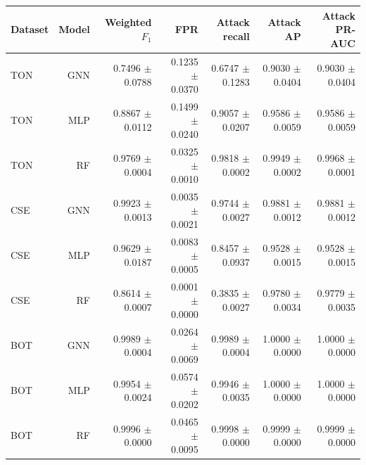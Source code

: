 \begin{tabular}{lrrrrrr}
\toprule
Dataset & Model & Weighted $F_1$ & FPR & Attack recall & Attack AP & Attack PR-AUC \\
\midrule
TON & GNN & 0.7496 $\pm$ 0.0788 & 0.1235 $\pm$ 0.0370 & 0.6747 $\pm$ 0.1283 & 0.9030 $\pm$ 0.0404 & 0.9030 $\pm$ 0.0404 \\
TON & MLP & 0.8867 $\pm$ 0.0112 & 0.1499 $\pm$ 0.0240 & 0.9057 $\pm$ 0.0207 & 0.9586 $\pm$ 0.0059 & 0.9586 $\pm$ 0.0059 \\
TON & RF & 0.9769 $\pm$ 0.0004 & 0.0325 $\pm$ 0.0010 & 0.9818 $\pm$ 0.0002 & 0.9949 $\pm$ 0.0002 & 0.9968 $\pm$ 0.0001 \\
CSE & GNN & 0.9923 $\pm$ 0.0013 & 0.0035 $\pm$ 0.0021 & 0.9744 $\pm$ 0.0027 & 0.9881 $\pm$ 0.0012 & 0.9881 $\pm$ 0.0012 \\
CSE & MLP & 0.9629 $\pm$ 0.0187 & 0.0083 $\pm$ 0.0005 & 0.8457 $\pm$ 0.0937 & 0.9528 $\pm$ 0.0015 & 0.9528 $\pm$ 0.0015 \\
CSE & RF & 0.8614 $\pm$ 0.0007 & 0.0001 $\pm$ 0.0000 & 0.3835 $\pm$ 0.0027 & 0.9780 $\pm$ 0.0034 & 0.9779 $\pm$ 0.0035 \\
BOT & GNN & 0.9989 $\pm$ 0.0004 & 0.0264 $\pm$ 0.0069 & 0.9989 $\pm$ 0.0004 & 1.0000 $\pm$ 0.0000 & 1.0000 $\pm$ 0.0000 \\
BOT & MLP & 0.9954 $\pm$ 0.0024 & 0.0574 $\pm$ 0.0202 & 0.9946 $\pm$ 0.0035 & 1.0000 $\pm$ 0.0000 & 1.0000 $\pm$ 0.0000 \\
BOT & RF & 0.9996 $\pm$ 0.0000 & 0.0465 $\pm$ 0.0095 & 0.9998 $\pm$ 0.0000 & 0.9999 $\pm$ 0.0000 & 0.9999 $\pm$ 0.0000 \\
\bottomrule
\end{tabular}
